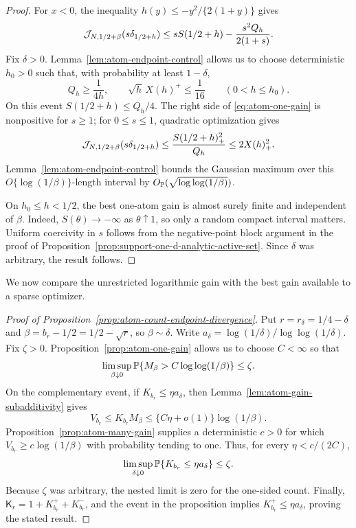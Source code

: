 \begin{proof}
For \(x<0\), the inequality
\(h(y)\le-y^2/\{2(1+y)\}\) gives
\begin{equation}
\label{eq:atom-one-gain}
 \mathcal J_{N,1/2+\beta}(s\delta_{1/2+h})
 \le sS(1/2+h)-\frac{s^2Q_h}{2(1+s)}.
\end{equation}
Fix \(\delta>0\). Lemma~\ref{lem:atom-endpoint-control} allows us to choose
deterministic \(h_0>0\) such that, with probability at least \(1-\delta\),
\[
    Q_h\ge\frac1{4h},
    \qquad \sqrt h\,X(h)^+\le\frac1{16}
    \qquad(0<h\le h_0).
\]
On this event \(S(1/2+h)\le Q_h/4\). The right side of
\eqref{eq:atom-one-gain} is nonpositive for \(s\ge1\); for \(0\le s\le1\),
quadratic optimization gives
\[
    \mathcal J_{N,1/2+\beta}(s\delta_{1/2+h})
    \le\frac{S(1/2+h)_+^2}{Q_h}\le2X(h)_+^2.
\]
Lemma~\ref{lem:atom-endpoint-control} bounds the Gaussian maximum over this
\(O\{\log(1/\beta)\}\)-length interval by
\(O_{\mathbb{P}}(\sqrt{\log\log(1/\beta)})\).

On \(h_0\le h<1/2\), the best one-atom gain is almost surely finite and
independent of \(\beta\). Indeed, \(S(\theta)\to-\infty\) as
\(\theta\uparrow1\), so only a random compact interval matters. Uniform
coercivity in \(s\) follows from the negative-point block argument in the
proof of Proposition~\ref{prop:support-one-d-analytic-active-set}. Since
\(\delta\) was arbitrary, the result follows.
\end{proof}

We now compare the unrestricted logarithmic gain with the best gain available
to a sparse optimizer.
\begin{proof}[Proof of Proposition~\ref{prop:atom-count-endpoint-divergence}]
Put \(r=r_\delta=1/4-\delta\) and
\(\beta=b_r-1/2=1/2-\sqrt r\), so \(\beta\sim\delta\). Write
\(a_\delta=\log(1/\delta)/\log\log(1/\delta)\). Fix \(\zeta>0\).
Proposition~\ref{prop:atom-one-gain} allows us to choose \(C<\infty\) so
that
\[
    \limsup_{\beta\downarrow0}
    \mathbb{P}\{M_\beta>C\log\log(1/\beta)\}\le\zeta.
\]
On the complementary event, if \(K_{b_r}\le\eta a_\delta\), then
Lemma~\ref{lem:atom-gain-subadditivity} gives
\[
    V_{b_r}\le K_{b_r}M_\beta
       \le \{C\eta+o(1)\}\log(1/\beta).
\]
Proposition~\ref{prop:atom-many-gain} supplies a deterministic \(c>0\) for
which \(V_{b_r}\ge c\log(1/\beta)\) with probability tending to one. Thus,
for every \(\eta<c/(2C)\),
\[
    \limsup_{\delta\downarrow0}
    \mathbb{P}\{K_{b_r}\le\eta a_\delta\}\le\zeta.
\]
Because \(\zeta\) was arbitrary, the nested limit is zero for the one-sided
count. Finally, \(\mathsf K_r=1+K_{b_r}^++K_{b_r}^-\), and the event in the
proposition implies \(K_{b_r}^+\le\eta a_\delta\), proving the stated result.
\end{proof}
